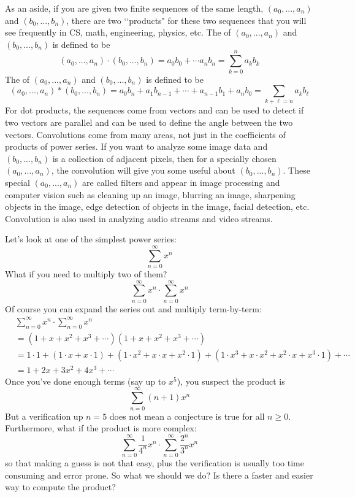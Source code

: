 As an aside, if you are given two finite sequences of the same length,
$(a_0, ..., a_n)$ and
$(b_0, ..., b_n)$, there are two \lq\lq products" for these two sequences
that you will see frequently in CS, math, engineering, physics, etc.
The  of 
$(a_0, ..., a_n)$ and
$(b_0, ..., b_n)$ is defined to be
\[
(a_0, ..., a_n) \cdot (b_0, ..., b_n) = a_0b_0 + \cdots a_nb_n = \sum_{k=0}^n a_k b_k
\]
The  
of 
$(a_0, ..., a_n)$ and
$(b_0, ..., b_n)$ is defined to be
\[
(a_0, ..., a_n) * (b_0, ..., b_n)
= a_0b_n + a_1b_{n-1} + \cdots + a_{n-1}b_1 + a_n b_0 = \sum_{k + \ell = n} a_kb_\ell
\]
For dot products, the sequences come from vectors
and can be used to detect if two vectors are parallel and can be used
to define the angle between the two vectors.
Convolutions come from many areas, not just in the coefficients of
products of power series.
If you want to analyze some image data and $(b_0,...,b_n)$ is a collection of adjacent
pixels, then for a specially chosen $(a_0, ..., a_n)$,
the convolution will give you some useful about $(b_0,...,b_n)$.
These special $(a_0, ..., a_n)$ are called filters and appear in
image processing and computer vision such as
cleaning up an image, blurring an image, 
sharpening objects in the image, edge detection of objects in the image,
facial detection, etc.
Convolution is also used in analyzing audio streams and video streams.

\newpage

\newpage
Let's look at one of the simplest power series:
\[
\sum_{n=0}^\infty x^n
\]
What if you need to multiply two of them?
\[
\sum_{n=0}^\infty x^n \cdot \sum_{n=0}^\infty x^n 
\]
Of course you can expand the series out and multiply term-by-term:
\begin{align*}
&\sum_{n=0}^\infty x^n \cdot \sum_{n=0}^\infty x^n  \\
&= (1 + x + x^2 + x^3 + \cdots ) (1 + x + x^2 + x^3 + \cdots)  \\
&= 
1\cdot 1 + 
(1\cdot x + x\cdot 1) + 
(1 \cdot x^2 + x \cdot x + x^2 \cdot 1) + 
(1 \cdot x^3 + x \cdot x^2 + x^2 \cdot x + x^3 \cdot 1) + 
\cdots
\\
&= 
1 + 
2x + 
3x^2 + 
4x^3 + 
\cdots
\end{align*}
Once you've done enough terms (say up to $x^5$), you suspect the product is
\[
\sum_{n = 0}^\infty (n+1)x^n
\]
But a verification up $n = 5$ does not mean a conjecture is true for all $n \geq 0$.
Furthermore, what if the product is more complex:
\[
\sum_{n=0}^\infty \frac{1}{4^n} x^n \cdot 
\sum_{n=0}^\infty
\frac{2^n}{3^n} x^n 
\]
so that making a guess is not that easy,
plus the verification is usually too time 
consuming and error prone. So what we should we do?
Is there a faster and easier way to compute the product?


